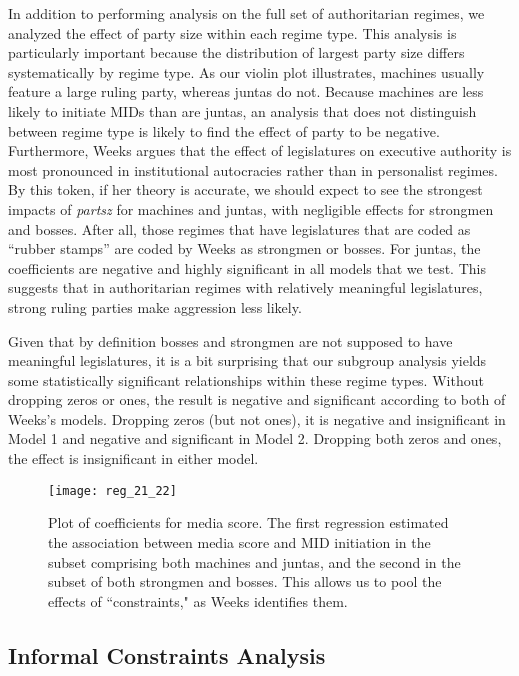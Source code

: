 \documentclass[12pt]{article}
\begin{document}
\par In addition to performing analysis on the full set of authoritarian regimes, we analyzed the effect of party size within each regime type. This analysis is particularly important because the distribution of largest party size differs systematically by regime type. As our violin plot illustrates, machines usually feature a large ruling party, whereas juntas do not. Because machines are less likely to initiate MIDs than are juntas, an analysis that does not distinguish between regime type is likely to find the effect of party to be negative. Furthermore, Weeks argues that the effect of legislatures on executive authority is most pronounced in institutional autocracies rather than in personalist regimes. By this token, if her theory is accurate, we should expect to see the strongest impacts of \textit{partsz} for machines and juntas, with negligible effects for strongmen and bosses. After all, those regimes that have legislatures that are coded as ``rubber stamps'' are coded by Weeks as strongmen or bosses. For juntas, the coefficients are negative and highly significant in all models that we test. This suggests that in authoritarian regimes with relatively meaningful legislatures, strong ruling parties make aggression less likely. 

\par Given that by definition bosses and strongmen are not supposed to have meaningful legislatures, it is a bit surprising that our subgroup analysis yields some statistically significant relationships within these regime types. Without dropping zeros or ones, the result is negative and significant according to both of Weeks's models. Dropping zeros (but not ones), it is negative and insignificant in Model 1 and negative and significant in Model 2. Dropping both zeros and ones, the effect is insignificant in either model. 

\begin{figure}
	\texttt{[image: reg\_21\_22]}
	\caption{Plot of coefficients for media score. The first regression estimated the association between media score and MID initiation in the subset comprising both machines and juntas, and the second in the subset of both strongmen and bosses. This allows us to pool the effects of ``constraints," as Weeks identifies them.}
\end{figure}

\subsection{Informal Constraints Analysis} 
\end{document}
